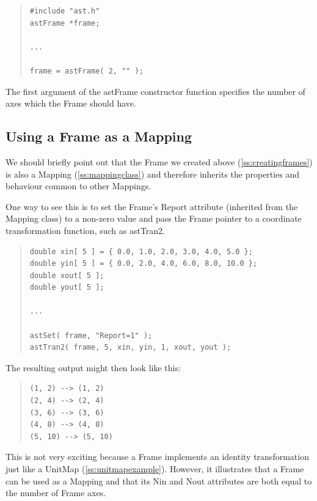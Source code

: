 \documentclass[twoside,11pt]{article}
\newcommand{\htmlref}[2]{#1}
\newcommand{\secref}[1]{\S\ref{#1}}
\renewcommand{\secref}[1]{\ref{#1}}
\begin{document}
\begin{quote}
\small
\begin{verbatim}
#include "ast.h"
astFrame *frame;

...

frame = astFrame( 2, "" );
\end{verbatim}
\normalsize
\end{quote}

The first argument of the \htmlref{astFrame}{astFrame} constructor function specifies the
number of axes which the Frame should have.

\subsection{\label{ss:frameasmapping}Using a Frame as a Mapping}

We should briefly point out that the \htmlref{Frame}{Frame} we created above
(\secref{ss:creatingframes}) is also a \htmlref{Mapping}{Mapping}
(\secref{ss:mappingclass}) and therefore inherits the properties and
behaviour common to other Mappings.

One way to see this is to set the Frame's \htmlref{Report}{Report} attribute (inherited
from the Mapping class) to a non-zero value and pass the Frame pointer
to a coordinate transformation function, such as \htmlref{astTran2}{astTran2}.

\begin{quote}
\small
\begin{verbatim}
double xin[ 5 ] = { 0.0, 1.0, 2.0, 3.0, 4.0, 5.0 };
double yin[ 5 ] = { 0.0, 2.0, 4.0, 6.0, 8.0, 10.0 };
double xout[ 5 ];
double yout[ 5 ];

...

astSet( frame, "Report=1" );
astTran2( frame, 5, xin, yin, 1, xout, yout );
\end{verbatim}
\normalsize
\end{quote}

The resulting output might then look like this:

\begin{quote}
\begin{verbatim}
(1, 2) --> (1, 2)
(2, 4) --> (2, 4)
(3, 6) --> (3, 6)
(4, 8) --> (4, 8)
(5, 10) --> (5, 10)
\end{verbatim}
\end{quote}

This is not very exciting because a Frame implements an identity
transformation just like a \htmlref{UnitMap}{UnitMap}
(\secref{ss:unitmapexample}). However, it illustrates that a Frame can
be used as a Mapping and that its \htmlref{Nin}{Nin} and \htmlref{Nout}{Nout} attributes are both
equal to the number of Frame axes.
\end{document}
